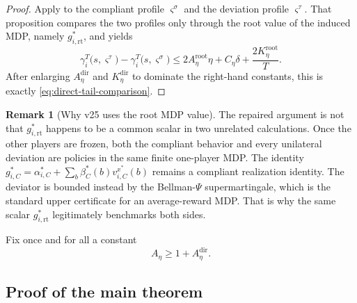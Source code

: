 \documentclass[12pt]{article}
\theoremstyle{definition}
\newtheorem{remark}[theorem]{Remark}
\newcommand{\1}{\mathbf{1}}
\begin{document}
\begin{proof}
Apply  to the compliant profile
$\varsigma^\sigma$ and the deviation profile $\varsigma^\tau$. That proposition compares the two profiles only through the root value of
the induced MDP, namely $g_{i,\mathrm{rt}}^*$, and yields
\[
\gamma_i^T\bigl(s,\varsigma^\tau\bigr)
-
\gamma_i^T\bigl(s,\varsigma^\sigma\bigr)
\le
2A_\eta^{\mathrm{root}}\eta + C_\eta\delta + \frac{2K_\eta^{\mathrm{root}}}{T}.
\]
After enlarging $A_\eta^{\mathrm{dir}}$ and $K_\eta^{\mathrm{dir}}$ to dominate the
right-hand constants, this is exactly \eqref{eq:direct-tail-comparison}.
\end{proof}

\begin{remark}[Why v25 uses the root MDP value]
The repaired argument is not that $g_{i,\mathrm{rt}}^*$ happens to be a common
scalar in two unrelated calculations. Once the other players are frozen, both
the compliant behavior and every unilateral deviation are policies in the same
finite one-player MDP. The identity
\(g_{i,C}^*=\alpha_{i,C}^*+\sum_b\beta_C^*(b)v_{i,C}^{x^*}(b)\)
remains a compliant realization identity. The deviator is bounded instead by the
Bellman-$\Psi$ supermartingale, which is the standard upper certificate for an
average-reward MDP. That is why the same scalar $g_{i,\mathrm{rt}}^*$
legitimately benchmarks both sides.
\end{remark}

Fix once and for all a constant
\[
A_\eta\ge 1+A_\eta^{\mathrm{dir}}.
\]

\subsection{Proof of the main theorem}
\end{document}
